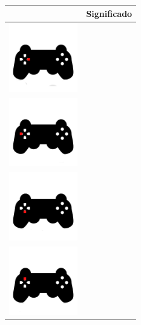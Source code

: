 \begin{table}[H]
  \begin{center}
    \begin{tabular}{|p{3cm}|p{8cm}|}
      \hline
      \centering{Botón} & \qquad \quad Significado \\
     \hline
      \includegraphics[width=3cm]{./imagenes/pad-2.png} & \vspace*{-.8in}{Giro cerrado a la derecha. Orden de giro a la derecha, el vehículo se detiene al soltar la cruceta.} \\
      \hline
      \includegraphics[width=3cm]{./imagenes/pad-4.png} & \vspace*{-.8in}{Giro cerrado a la izquierda. Orden de giro a la izquierda, el vehículo se detiene al soltar la cruceta.} \\
      \hline
       \includegraphics[width=3cm]{./imagenes/pad-3.png} & \vspace*{-.8in}{Retroceder. Orden de movimiento en retroceso, el vehículo se detiene al soltar la cruceta.} \\
      \hline
       \includegraphics[width=3cm]{./imagenes/pad-1.png} & \vspace*{-.8in}{Avanzar. Orden de movimiento hacia delante, el vehículo se detiene al soltar la cruceta.} \\

\end{tabular}
\end{center}
\end{table}
